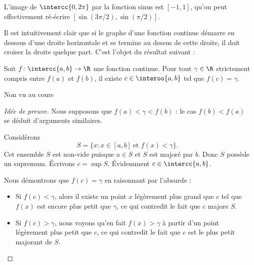 \begin{frame}
\begin{example}%
  L'image de \(\intercc{0,2\pi}\) par la fonction sinus est \([-1,1]\), qu'on peut effectivement ré-écrire \([\sin(3\pi/2),\sin(\pi/2)]\).
\end{example}
\end{frame}
\begin{frame}%
  Il est intuitivement clair que si le graphe d'une fonction continue \og démarre\fg{} en dessous d'une droite horizontale et se termine au dessus de cette droite, il doit croiser la droite quelque part. C'est l'objet du résultat suivant \pause:

  \begin{theorem}
    Soit $f \colon \intercc{a,b} \to \R$ une fonction continue. Pour tout $\gamma \in \R$ strictement compris entre $f(a)$ et $f(b)$, il existe $c\in \interoo{a,b}$ tel que $f(c) = \gamma$.
  \end{theorem}
\end{frame}

\begin{frame}{Non vu au cours}%
\begin{proof}[Idée de preuve]
  Nous supposons que $f(a) < \gamma < f(b)$ : le cas $f(b) < f(a)$ se déduit d'arguments similaires.\pause

  Considérons
  \[
  S = \{ x : x\in[a,b] \ \text{et }f(x)<\gamma\}.
  \]
  Cet ensemble $S$ est non-vide puisque $a \in S$ et $S$ est majoré par $b$. Donc $S$ possède un supremum. Écrivons $c= \sup S$. Évidemment $c \in \intercc{a,b} $.\pause

  Nous démontrons que $f(c) = \gamma$ en raisonnant par l'absurde :
  \begin{itemize}[<+->]
  \item Si $f(c) < \gamma$, alors il existe un point $x$ légèrement plus grand que $c$ tel que $f(x)$ est encore plus petit que $\gamma$, ce qui contredit le fait que $c$ majore $S$.
  \item Si $f(c) > \gamma$, nous voyons qu'en fait $f(x) > \gamma$ à partir d'un point légèrement plus petit que $c$, ce qui contredit le fait que $c$ est le plus petit majorant de $S$.
  \end{itemize}
\end{proof}
\end{frame}

